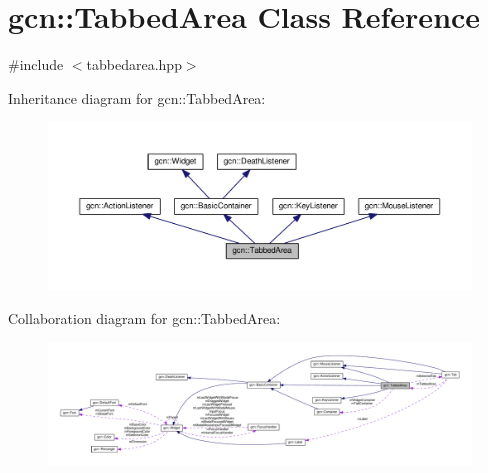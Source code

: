 \hypertarget{classgcn_1_1TabbedArea}{}\section{gcn\+:\+:Tabbed\+Area Class Reference}
\label{classgcn_1_1TabbedArea}


{\ttfamily \#include $<$tabbedarea.\+hpp$>$}



Inheritance diagram for gcn\+:\+:Tabbed\+Area\+:\nopagebreak
\begin{figure}[H]
\begin{center}
\leavevmode
\includegraphics[width=350pt]{classgcn_1_1TabbedArea__inherit__graph}
\end{center}
\end{figure}


Collaboration diagram for gcn\+:\+:Tabbed\+Area\+:\nopagebreak
\begin{figure}[H]
\begin{center}
\leavevmode
\includegraphics[width=350pt]{classgcn_1_1TabbedArea__coll__graph}
\end{center}
\end{figure}
